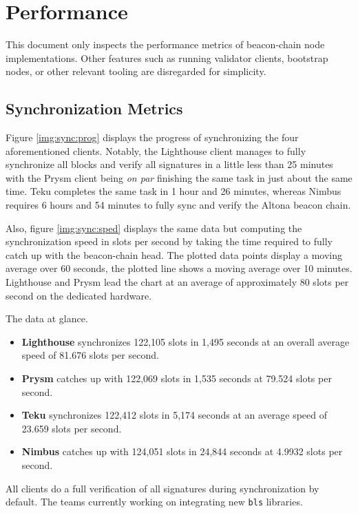\documentclass[twoside,twocolumn]{article}
\begin{document}
\section{Performance}
\label{sec:perf}
This document only inspects the performance metrics of beacon-chain node implementations. Other features such as running validator clients, bootstrap nodes, or other relevant tooling are disregarded for simplicity.

\subsection{Synchronization Metrics}
Figure \ref{img:sync:prog} displays the progress of synchronizing the four aforementioned clients. Notably, the Lighthouse client manages to fully synchronize all blocks and verify all signatures in a little less than 25 minutes with the Prysm client being \textit{on par} finishing the same task in just about the same time. Teku completes the same task in 1 hour and 26 minutes, whereas Nimbus requires 6 hours and 54 minutes to fully sync and verify the Altona beacon chain.\par

Also, figure \ref{img:sync:sped} displays the same data but computing the synchronization speed in slots per second by taking the time required to fully catch up with the beacon-chain head. The plotted data points display a moving average over 60 seconds, the plotted line shows a moving average over 10 minutes. Lighthouse and Prysm lead the chart at an average of approximately 80 slots per second on the dedicated hardware.\par

The data at glance.
\begin{itemize}
\item \textbf{Lighthouse} synchronizes 122,105 slots in 1,495 seconds at an overall average speed of 81.676 slots per second.
\item \textbf{Prysm} catches up with 122,069 slots in 1,535 seconds at 79.524 slots per second.
\item \textbf{Teku} synchronizes 122,412 slots in 5,174 seconds at an average speed of 23.659 slots per second.
\item \textbf{Nimbus} catches up with 124,051 slots in 24,844 seconds at 4.9932 slots per second.
\end{itemize}

All clients do a full verification of all signatures during synchronization by default. The teams currently working on integrating new \texttt{bls} libraries.\par
\end{document}
